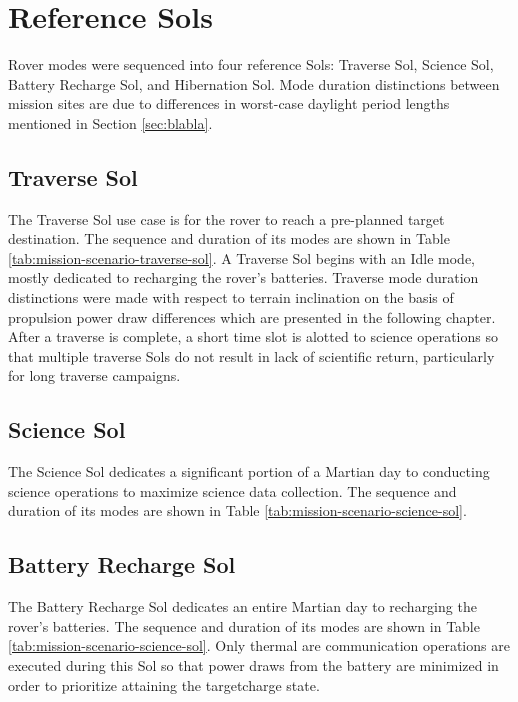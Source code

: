 \clearpage
\section{Reference Sols}
\label{sec:ReferenceSols:ReferenceSols}
Rover modes were sequenced into four reference Sols: Traverse Sol, Science Sol, Battery Recharge Sol, and Hibernation Sol. Mode duration distinctions between mission sites are due to differences in worst-case daylight period lengths mentioned in Section \ref{sec:blabla}.

\subsection{Traverse Sol}
\label{sec:ReferenceSols:TraverseSol}
The Traverse Sol use case is for the rover to reach a pre-planned target destination. The sequence and duration of its modes are shown in Table \ref{tab:mission-scenario-traverse-sol}. A Traverse Sol begins with an Idle mode, mostly dedicated to recharging the rover's batteries. Traverse mode duration distinctions were made with respect to terrain inclination on the basis of propulsion power draw differences which are presented in the following chapter. After a traverse is complete, a short time slot is alotted to science operations so that multiple traverse Sols do not result in lack of scientific return, particularly for long traverse campaigns.



\subsection{Science Sol}
\label{sec:ReferenceSols:ScienceSol}
The Science Sol dedicates a significant portion of a Martian day to conducting science operations to maximize science data collection. The sequence and duration of its modes are shown in Table \ref{tab:mission-scenario-science-sol}.



\clearpage
\subsection{Battery Recharge Sol}
\label{sec:ReferenceSols:BatteryRechargeSol}
The Battery Recharge Sol dedicates an entire Martian day to recharging the rover's batteries. The sequence and duration of its modes are shown in Table \ref{tab:mission-scenario-science-sol}. Only thermal are communication operations are executed during this Sol so that power draws from the battery are minimized in order to prioritize attaining the targetcharge state.

